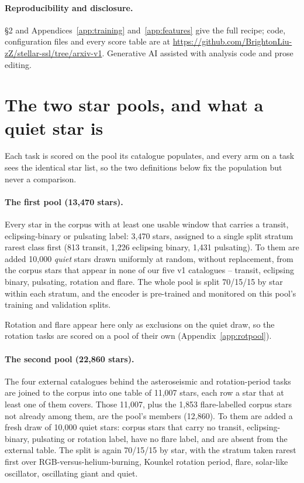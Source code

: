 \documentclass{article}
\begin{document}
\paragraph{Reproducibility and disclosure.} \S2 and Appendices~\ref{app:training}
and~\ref{app:features} give the full recipe; code, configuration files and every score table are at
\url{https://github.com/BrightonLiu-zZ/stellar-ssl/tree/arxiv-v1}. Generative AI assisted with
analysis code and prose editing.

\raggedbottom



\appendix

\section{The two star pools, and what a quiet star is}
\label{app:pools}

Each task is scored on the pool its catalogue populates, and every arm on a task sees the identical
star list, so the two definitions below fix the population but never a comparison.

\paragraph{The first pool (13{,}470 stars).} Every star in the corpus with at least one usable window
that carries a transit, eclipsing-binary or pulsating label: 3{,}470 stars, assigned to a single
split stratum rarest class first (813 transit, 1{,}226 eclipsing binary, 1{,}431 pulsating). To them
are added 10{,}000 \emph{quiet} stars drawn uniformly at random, without replacement, from the corpus
stars that appear in none of our five v1 catalogues -- transit, eclipsing binary, pulsating, rotation
and flare. The whole pool is split 70/15/15 by star within each stratum, and the encoder is
pre-trained and monitored on this pool's training and validation splits.

Rotation and flare appear here only as exclusions on the quiet draw, so the rotation tasks are scored
on a pool of their own (Appendix~\ref{app:rotpool}).

\paragraph{The second pool (22{,}860 stars).} The four external catalogues behind the asteroseismic
and rotation-period tasks are joined to the corpus into one table of 11{,}007 stars, each row a star
that at least one of them covers. Those 11{,}007, plus the 1{,}853 flare-labelled corpus stars not
already among them, are the pool's members (12{,}860). To them are added a fresh draw of 10{,}000
quiet stars: corpus stars that carry no transit, eclipsing-binary, pulsating or rotation label, have
no flare label, and are absent from the external table. The split is again 70/15/15 by star, with the
stratum taken rarest first over RGB-versus-helium-burning, Kounkel rotation period, flare, solar-like
oscillator, oscillating giant and quiet.
\end{document}
